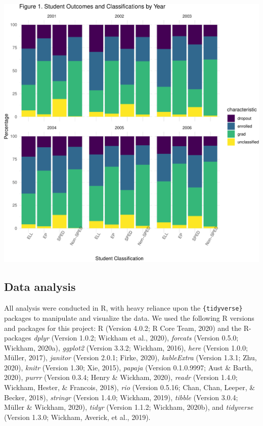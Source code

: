 \documentclass[
  english,
  man, fleqn, noextraspace]{apa6}
\begin{document}
\includegraphics{EDLD_651_Final_Project_Draft_files/figure-latex/descriptives_of_dataset-1.pdf}

\hypertarget{data-analysis}{%
\subsection{Data analysis}\label{data-analysis}}

All analysis were conducted in R, with heavy reliance upon the \texttt{\{tidyverse\}} packages to manipulate and visualize the data.
We used the following R versions and packages for this project:
R (Version 4.0.2; R Core Team, 2020) and the R-packages \emph{dplyr} (Version 1.0.2; Wickham et al., 2020), \emph{forcats} (Version 0.5.0; Wickham, 2020a), \emph{ggplot2} (Version 3.3.2; Wickham, 2016), \emph{here} (Version 1.0.0; Müller, 2017), \emph{janitor} (Version 2.0.1; Firke, 2020), \emph{kableExtra} (Version 1.3.1; Zhu, 2020), \emph{knitr} (Version 1.30; Xie, 2015), \emph{papaja} (Version 0.1.0.9997; Aust \& Barth, 2020), \emph{purrr} (Version 0.3.4; Henry \& Wickham, 2020), \emph{readr} (Version 1.4.0; Wickham, Hester, \& Francois, 2018), \emph{rio} (Version 0.5.16; Chan, Chan, Leeper, \& Becker, 2018), \emph{stringr} (Version 1.4.0; Wickham, 2019), \emph{tibble} (Version 3.0.4; Müller \& Wickham, 2020), \emph{tidyr} (Version 1.1.2; Wickham, 2020b), and \emph{tidyverse} (Version 1.3.0; Wickham, Averick, et al., 2019).
\end{document}
